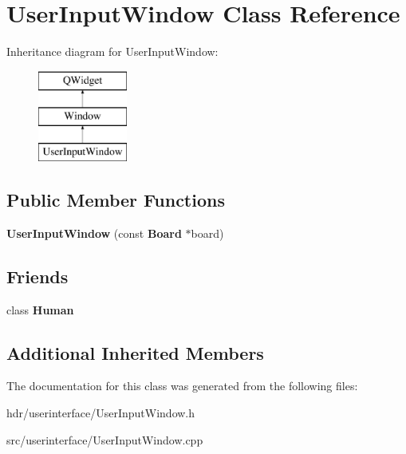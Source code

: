 \section{User\-Input\-Window Class Reference}
\label{class_user_input_window}
Inheritance diagram for User\-Input\-Window\-:\begin{figure}[H]
\begin{center}
\leavevmode
\includegraphics[height=3.000000cm]{class_user_input_window}
\end{center}
\end{figure}
\subsection*{Public Member Functions}
\begin{DoxyCompactItemize}
\item 
{\bfseries User\-Input\-Window} (const {\bf Board} $\ast$board)\label{class_user_input_window_a59edbac899c7c5ea5c306bbeb72890c4}

\end{DoxyCompactItemize}
\subsection*{Friends}
\begin{DoxyCompactItemize}
\item 
class {\bfseries Human}\label{class_user_input_window_aa028043847be08771446e72e91baa53d}

\end{DoxyCompactItemize}
\subsection*{Additional Inherited Members}


The documentation for this class was generated from the following files\-:\begin{DoxyCompactItemize}
\item 
hdr/userinterface/User\-Input\-Window.\-h\item 
src/userinterface/User\-Input\-Window.\-cpp\end{DoxyCompactItemize}
